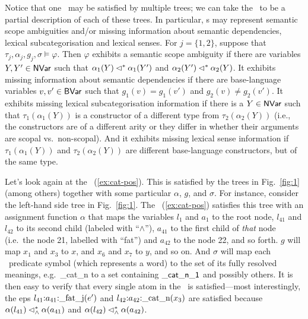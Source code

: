 Notice that one \rmrs\ may be satisfied by multiple trees; we can take
the \rmrs\ to be a partial description of each of these trees.  In
particular, \rmrs s may represent semantic scope ambiguities and/or
missing information about semantic dependencies, lexical
subcategorisation and lexical senses.  For $j=\{1,2\}$, suppose that
$\tau_j,\alpha_j,g_j,\sigma\models \varphi$.  Then $\varphi$ exhibits
a semantic scope ambiguity if there are variables $Y,Y'\in \mathsf{NVar}$ such
that $\alpha_1(Y) \lhd^* \alpha_1(Y')$ and $\alpha_2(Y')\lhd^*
\alpha_2(Y)$.  It exhibits missing information about semantic
dependencies if there are base-language variables $v,v'\in \mathsf{BVar}$ such
that $g_1(v)=g_1(v')$ and $g_2(v)\neq g_2(v')$.  It exhibits missing
lexical subcategorisation information if there is a $ Y \in \mathsf{NVar}$
such that $\tau_1(\alpha_1(Y))$ is a constructor of a different type
from $\tau_2(\alpha_2(Y))$ (i.e., the constructors are of a different
arity or they differ in whether their arguments are scopal vs.\
non-scopal).  And it exhibits missing lexical
sense information if $\tau_1(\alpha_1(Y))$ and $\tau_2(\alpha_2(Y))$
are different base-language constructors, but of the same type.

Let's look again at the \rmrs\ (\ref{ex:cat-pos}).
This is satisfied by the trees in Fig.~\ref{fig:1} (among
others) together with some particular $\alpha$, $g$, and $\sigma$.
For instance, consider the left-hand side tree in Fig.~\ref{fig:1}.
The \rmrs\ (\ref{ex:cat-pos}) satisfies this tree with an assignment
function $\alpha$ that maps the variables $l_1$ and $a_1$ to the root
node, $l_{41}$ and $l_{42}$ to its second child (labeled with
``$\wedge$''), $a_{41}$ to the first child of \emph{that} node (i.e.\
the node 21, labelled with ``fat'') and $a_{42}$ to the node 22, and
so forth.  $g$ will map $x_1$ and $x_3$ to $x$, and $x_6$ and $x_7$ to
$y$, and so on.  And $\sigma$ will map each \rmrs\ predicate symbol
(which represents a word) to the set of its fully resolved meanings, e.g.\
\_cat\_n to a set containing $\mathsf{\_cat\_n\_1}$ and possibly others.
It is then easy to verify that every single atom in the \rmrs\ is
satisfied---most interestingly, the {\sc ep}s
$l_{41} {:} a_{41} {:} \mathrm{\_fat\_j}(e')$ and
$l_{42} {:} a_{42} {:} \mathrm{\_cat\_n}(x_3)$ are satisfied because
$\alpha(l_{41}) \lhd^*_\wedge \alpha(a_{41})$ and $\alpha(l_{42})
\lhd^*_\wedge \alpha(a_{42})$.

